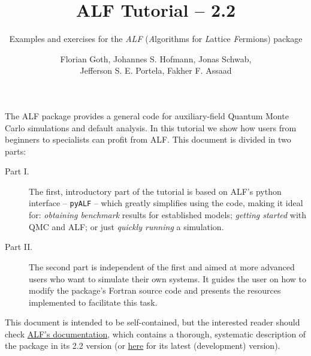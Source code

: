 \documentclass[10pt,modern]{scrartcl}
\numberwithin{exerciseitem}{exercise} %
\newcommand{\ALFver}{2.2}          %
\newcommand{\ALFbranch}{ALF-2.2}   %
\newcommand{\tutALFver}{2.2}       %
\begin{document}
\title{ ALF Tutorial -- \tutALFver{}}
\subtitle{Examples and exercises for the \emph{ALF} (\emph{A}lgorithms for \emph{L}attice \emph{F}ermions) package} %
\author{Florian Goth,  Johannes S. Hofmann,  Jonas Schwab,\\  Jefferson S. E. Portela,  Fakher F. Assaad }
\maketitle



The ALF package provides a general code for auxiliary-field Quantum Monte Carlo simulations and default analysis. In this tutorial we show how users from beginners to specialists can profit from ALF. This document is divided in two parts:
\begin{description}
\item[Part I.] The first, introductory part of the tutorial is based on ALF's python interface -- \texttt{pyALF} -- which greatly simplifies using the code, making it ideal for: \emph{obtaining benchmark} results for established models; \emph{getting started} with QMC and ALF; or just \emph{quickly running} a simulation.
\item[Part II.] The second part is independent of the first and aimed at more advanced users who want to simulate their own systems. It guides the user on how to modify the package's Fortran source code and presents the resources implemented to facilitate this task.
\end{description}

This document is intended to be self-contained, but the interested reader should check \href{https://git.physik.uni-wuerzburg.de/ALF/ALF/-/blob/\ALFbranch/Documentation/doc.pdf}{ALF's documentation}, which contains a thorough, systematic description of the package in its \ALFver{} version (or \href{https://git.physik.uni-wuerzburg.de/ALF/ALF/-/blob/master/Documentation/doc.pdf}{here} for its latest (development) version).
\end{document}
